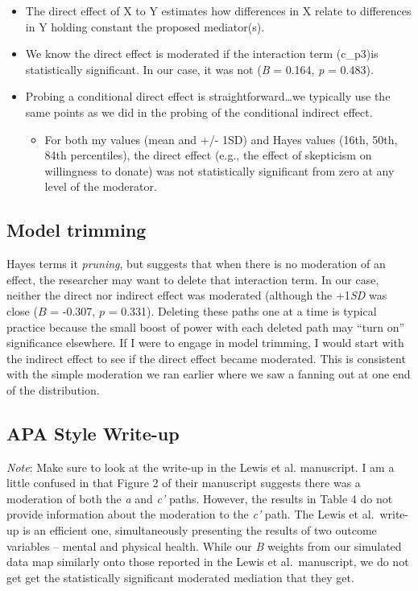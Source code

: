 \documentclass[
  11pt,
]{book}
\providecommand{\tightlist}{%
  \setlength{\itemsep}{0pt}\setlength{\parskip}{0pt}}
\begin{document}
\begin{itemize}
\tightlist
\item
  The direct effect of X to Y estimates how differences in X relate to differences in Y holding constant the proposed mediator(s).
\item
  We know the direct effect is moderated if the interaction term (c\_p3)is statistically significant. In our case, it was not (\emph{B} = 0.164, \emph{p} = 0.483).
\item
  Probing a conditional direct effect is straightforward\ldots we typically use the same points as we did in the probing of the conditional indirect effect.

  \begin{itemize}
  \tightlist
  \item
    For both my values (mean and +/- 1SD) and Hayes values (16th, 50th, 84th percentiles), the direct effect (e.g., the effect of skepticism on willingness to donate) was not statistically significant from zero at any level of the moderator.
  \end{itemize}
\end{itemize}

\hypertarget{model-trimming}{%
\subsection{Model trimming}\label{model-trimming}}

Hayes terms it \emph{pruning}, but suggests that when there is no moderation of an effect, the researcher may want to delete that interaction term. In our case, neither the direct nor indirect effect was moderated (although the +1\emph{SD} was close (\(B\) = -0.307, \(p\) = 0.331). Deleting these paths one at a time is typical practice because the small boost of power with each deleted path may ``turn on'' significance elsewhere. If I were to engage in model trimming, I would start with the indirect effect to see if the direct effect became moderated. This is consistent with the simple moderation we ran earlier where we saw a fanning out at one end of the distribution.

\hypertarget{apa-style-write-up-1}{%
\subsection{APA Style Write-up}\label{apa-style-write-up-1}}

\emph{Note}: Make sure to look at the write-up in the Lewis et al. \citep{lewis_applying_2017} manuscript. I am a little confused in that Figure 2 of their manuscript suggests there was a moderation of both the \emph{a} and \emph{c'} paths. However, the results in Table 4 do not provide information about the moderation to the \emph{c'} path. The Lewis et al.~write-up is an efficient one, simultaneously presenting the results of two outcome variables -- mental and physical health. While our \emph{B} weights from our simulated data map similarly onto those reported in the Lewis et al.~manuscript, we do not get get the statistically significant moderated mediation that they get.
\end{document}
